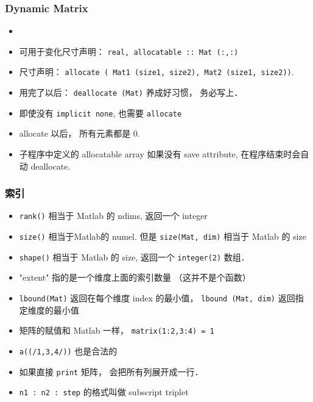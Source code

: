 \subsubsection{Dynamic Matrix}
\begin{itemize}
\item \item 可用于变化尺寸声明： \verb`real, allocatable :: Mat (:,:)`
\item 尺寸声明： \verb`allocate ( Mat1 (size1, size2), Mat2 (size1, size2))`.
\item 用完了以后： \verb`deallocate (Mat)` 养成好习惯， 务必写上．
\item 即使没有 \verb`implicit none`, 也需要 \verb`allocate`
\item allocate 以后， 所有元素都是 0.
\item 子程序中定义的 allocatable array 如果没有 save attribute, 在程序结束时会自动 deallocate.
\end{itemize}

\subsubsection{索引}
\begin{itemize}
\item \verb`rank()` 相当于 Matlab 的 ndims, 返回一个 integer
\item \verb`size()` 相当于Matlab的 numel. 但是 \verb`size(Mat, dim)` 相当于 Matlab 的 size
\item \verb`shape()` 相当于 Matlab 的 size, 返回一个 \verb`integer(2)` 数组．
\item "extent" 指的是一个维度上面的索引数量 （这并不是个函数）
\item \verb`lbound(Mat)` 返回在每个维度 index 的最小值， \verb`lbound (Mat, dim)` 返回指定维度的最小值
\item 矩阵的赋值和 Matlab 一样， \verb`matrix(1:2,3:4) = 1`
\item \verb`a((/1,3,4/))` 也是合法的
\item 如果直接 \verb`print` 矩阵， 会把所有列展开成一行．
\item \verb`n1 : n2 : step` 的格式叫做 subscript triplet
\end{itemize}

